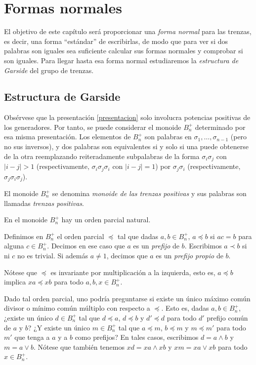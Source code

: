 \documentclass[TFG.tex]{subfiles}
\begin{document}
\chapter{Formas normales}

El objetivo de este capítulo será proporcionar una \emph{forma normal} para las trenzas, es decir, una forma ``estándar'' de escribirlas, de modo que para ver si dos palabras son iguales sea suficiente calcular sus formas normales y comprobar si son iguales. Para llegar hasta esa forma normal estudiaremos la \emph{estructura de Garside} \cite{Garside} del grupo de trenzas. 

\section{Estructura de Garside}



Obsérvese que la presentación \ref{presentacion} solo involucra potencias positivas de los generadores. Por tanto, se puede considerar el monoide $B_n^+$ determinado por esa misma presentación. Los elementos de $B_n^+$ son palabras en $\sigma_1,\dots,\sigma_{n-1}$ (pero no sus inversos), y dos palabras son equivalentes si y solo si una puede obtenerse de la otra reemplazando reiteradamente subpalabras de la forma $\sigma_i\sigma_j$ con $|i-j|>1$ (respectivamente, $\sigma_i\sigma_j\sigma_i$ con $|i-j|=1$) por $\sigma_j\sigma_i$ (respectivamente, $\sigma_j\sigma_i\sigma_j$).

\begin{defi}
El monoide $B_n^+$ se denomina \emph{monoide de las trenzas positivas} y sus palabras son llamadas \emph{trenzas positivas}.
\end{defi}
En el monoide $B_n^+$ hay un orden parcial natural. 
\begin{defi}
Definimos en $B_n^+$ el orden parcial $\preccurlyeq$ tal que dadas $a,b\in B_n^+$, $a\preccurlyeq b$ si $ac=b$ para alguna $c\in B_n^+$. Decimos en ese caso que $a$ es un \emph{prefijo} de $b$. Escribimos $a\prec b$ si ni $c$ no es trivial. Si además $a\neq 1$, decimos que $a$ es un \emph{prefijo propio} de $b$. 
\end{defi}
Nótese que $\preccurlyeq$ es invariante por multiplicación a la izquierda, esto es, $a\preccurlyeq b$ implica $xa\preccurlyeq xb$ para todo $a,b,x\in B_n^+$. %

Dado tal orden parcial, uno podría preguntarse si existe un único máximo común divisor o mínimo común múltiplo con respecto a $\preccurlyeq$. Esto es, dadas $a,b\in B_n^+$, ¿existe un único $d\in B_n^+$ tal que $d\preccurlyeq a$, $d\preccurlyeq b$ y $d'\preccurlyeq d$ para todo $d'$ prefijo común de $a$ y $b$? ¿Y existe un único $m\in B_n^+$ tal que $a\preccurlyeq m$, $b\preccurlyeq m$ y $m\preccurlyeq m'$ para todo $m'$ que tenga a $a$ y a $b$ como prefijos? En tales casos, escribimos $d=a\land b$ y $m=a\lor b$. Nótese que también tenemos $xd=xa\land xb$ y $xm=xa\lor xb$ para todo $x\in B_n^+$.
\end{document}
